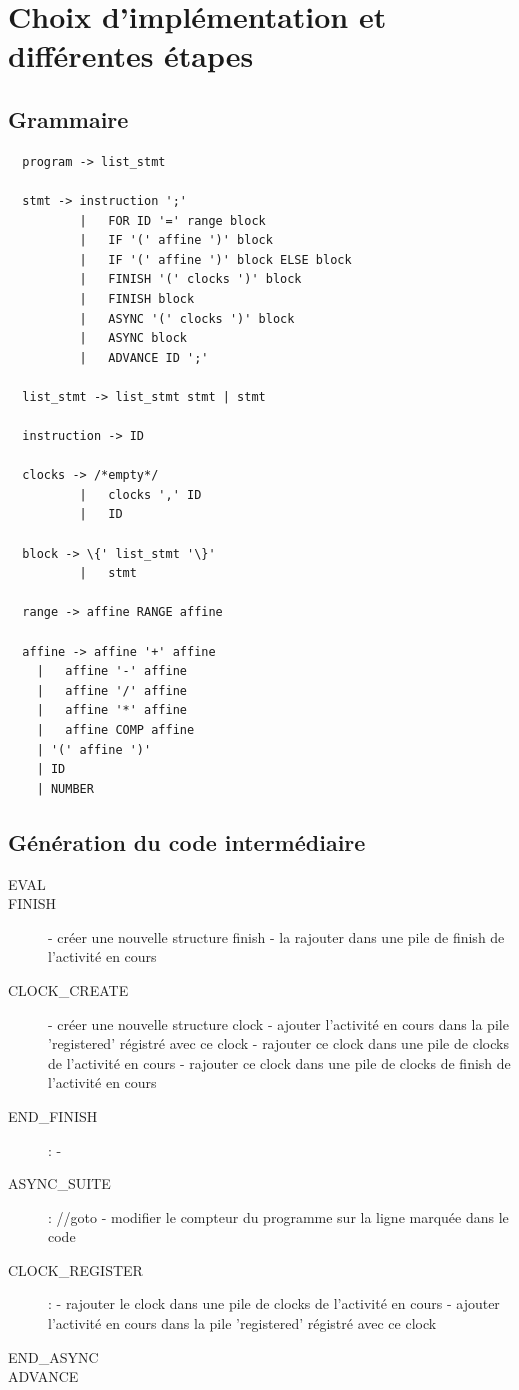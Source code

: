 \documentclass[12pt]{scrartcl}
\begin{document}
\newpage
\section{Choix d'implémentation et différentes étapes}

\subsection{Grammaire}
\begin{lstlisting}
  program -> list_stmt

  stmt -> instruction ';' 
          |   FOR ID '=' range block 
          |   IF '(' affine ')' block  
          |   IF '(' affine ')' block ELSE block
          |   FINISH '(' clocks ')' block
          |   FINISH block
          |   ASYNC '(' clocks ')' block
          |   ASYNC block
          |   ADVANCE ID ';'

  list_stmt -> list_stmt stmt | stmt

  instruction -> ID

  clocks -> /*empty*/
          |   clocks ',' ID
          |   ID

  block -> \{' list_stmt '\}'
          |   stmt

  range -> affine RANGE affine

  affine -> affine '+' affine
    |   affine '-' affine
    |   affine '/' affine
    |   affine '*' affine
    |   affine COMP affine
    | '(' affine ')'
    | ID
    | NUMBER
\end{lstlisting}

\newpage
\subsection{Génération du code intermédiaire}
\begin{description}
  \item[EVAL]

  \item[FINISH]
  - créer une nouvelle structure finish
  - la rajouter dans une pile de finish de l'activité en cours

  \item[CLOCK_CREATE]
  - créer une nouvelle structure clock
  - ajouter l'activité en cours dans la pile 'registered' régistré avec ce clock
  - rajouter ce clock dans une pile de clocks de l'activité en cours
  - rajouter ce clock dans une pile de clocks de finish de l'activité en cours

  \item[END_FINISH]:
  - 
  \item[ASYNC_SUITE]: 
  //goto
  - modifier le compteur du programme sur la ligne marquée dans le code
  \item[CLOCK_REGISTER]:
  - rajouter le clock dans une pile de clocks de l'activité en cours
  - ajouter l'activité en cours dans la pile 'registered'  régistré avec ce clock
  \item [END_ASYNC]   
  \item [ADVANCE]
\end{description}
\end{document}
